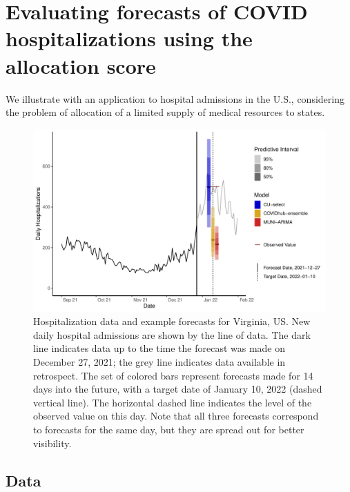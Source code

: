 \documentclass{article}\usepackage[]{graphicx}\usepackage[]{xcolor}
\begin{document}
\section{Evaluating forecasts of COVID hospitalizations using the allocation score}
\label{sec:application}

We illustrate with an application to hospital admissions in the U.S., considering the problem of allocation of a limited supply of medical resources to states.

\begin{figure}
    \includegraphics[width=\textwidth]{../figures/allocation-forecasts-v2.pdf}
    \caption{Hospitalization data and example forecasts for Virginia, US. New daily hospital admissions are shown by the line of data. The dark line indicates data up to the time the forecast was made on December 27, 2021; the grey line indicates data available in retrospect. The set of colored bars represent forecasts made for 14 days into the future, with a target date of January 10, 2022 (dashed vertical line). The horizontal dashed line indicates the level of the observed value on this day. Note that all three forecasts correspond to forecasts for the same day, but they are spread out for better visibility. }
    \label{fig:sample-forecasts}
\end{figure}


\subsection{Data}
\end{document}
